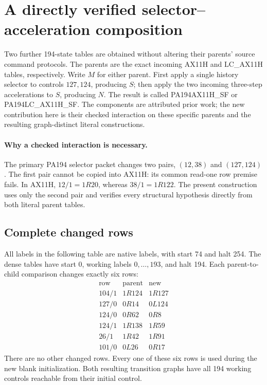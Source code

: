 \section{A directly verified selector--acceleration composition}
\label{sec:selector-fast-composite}

Two further 194-state tables are obtained without altering their parents'
source command protocols. The parents are the exact incoming AX11H and
LC\_AX11H tables, respectively. Write $M$ for either parent. First apply a
single history selector to controls $127,124$, producing $S$; then apply the
two incoming three-step accelerations to $S$, producing $N$. The result is
called PA194AX11H\_SF or PA194LC\_AX11H\_SF. The components are attributed
prior work; the new contribution here is their checked interaction on these
specific parents and the resulting graph-distinct literal constructions.

\paragraph{Why a checked interaction is necessary.}
The primary PA194 selector packet changes two pairs, $(12,38)$ and
$(127,124)$. The first pair cannot be copied into AX11H: its common read-one
row premise fails. In AX11H, $12/1=1R20$, whereas $38/1=1R122$.
The present construction uses only the second pair and verifies every
structural hypothesis directly from both literal parent tables.

\subsection{Complete changed rows}

All labels in the following table are native labels, with start 74 and
halt 254. The dense tables have start 0, working labels $0,\ldots,193$, and
halt 194. Each parent-to-child comparison changes exactly six rows:
\[
\begin{array}{c|c|c}
\text{row}&\text{parent}&\text{new}\\ \hline
104/1&1R124&1R127\\
127/0&0R14&0L124\\
124/0&0R62&0R8\\
124/1&1R138&1R59\\
26/1&1R42&1R91\\
101/0&0L26&0R17
\end{array}
\]
There are no other changed rows. Every one of these six rows is used during
the new blank initialization. Both resulting transition graphs have all
194 working controls reachable from their initial control.

